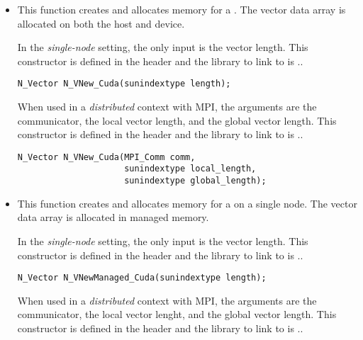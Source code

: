 \begin{itemize}


\item {}

  This function creates and allocates memory for a {\cuda} .
  The vector data array is allocated on both the host and device.

  In the \textit{single-node} setting, the only input is the vector length. This
  constructor is defined in the header  and the library to
  link to is ..

\begin{verbatim}
N_Vector N_VNew_Cuda(sunindextype length);
\end{verbatim}

  When used in a \textit{distributed} context with MPI, the arguments are the
  {\mpi} communicator, the local vector length, and the global vector length.
  This constructor is defined in the header  and
  the library to link to is ..

\begin{verbatim}
N_Vector N_VNew_Cuda(MPI_Comm comm,
                     sunindextype local_length,
                     sunindextype global_length);
\end{verbatim}


\item {}

  This function creates and allocates memory for a {\cuda} 
  on a single node. The vector data array is allocated in managed memory.

  In the \textit{single-node} setting, the only input is the vector length. This
  constructor is defined in the header  and the library to
  link to is ..

\begin{verbatim}
N_Vector N_VNewManaged_Cuda(sunindextype length);
\end{verbatim}

  When used in a \textit{distributed} context with MPI, the arguments are the
  {\mpi} communicator, the local vector lenght, and the global vector length.
  This constructor is defined in the header  and
  the library to link to is ..


\end{itemize}
